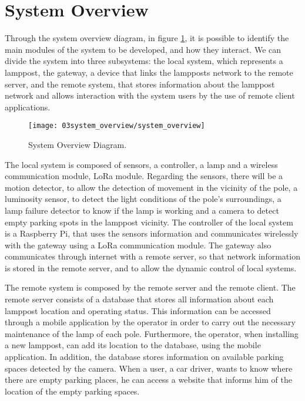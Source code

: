 \section{System Overview}
Through the system overview diagram, in figure \ref{fig:system_overview}, it is possible to identify the main modules of the system to be developed, and how they interact. We can divide the system into three subsystems: the local system, which represents a lamppost, the gateway, a device that links the lampposts network to the remote server, and the remote system, that stores information about the lamppost network and allows interaction with the system users by the use of remote client applications.

\begin{figure}[H]
	\centering
	\texttt{[image: 03system\_overview/system\_overview]}
	\caption{System Overview Diagram.}
	\label{fig:system_overview}
\end{figure}

The local system is composed of sensors, a controller, a lamp and a wireless communication module, LoRa module. Regarding the sensors, there will be a motion detector, to allow the detection of movement in the vicinity of the pole, a luminosity sensor, to detect the light conditions of the pole’s surroundings, a lamp failure detector to know if the lamp is working and a camera to detect empty parking spots in the lamppost vicinity. The controller of the local system is a Raspberry Pi, that uses the sensors information and communicates wirelessly with the gateway using a LoRa communication module. The gateway also communicates through internet with a remote server, so that network information is stored in the remote server, and to allow the dynamic control of local systems.

The remote system is composed by the remote server and the remote client. The remote server consists of a database that stores all information about each lamppost location and operating status. This information can be accessed through a mobile application by the operator in order to carry out the necessary maintenance of the lamp of each pole. Furthermore, the operator, when installing a new lamppost, can add its location to the database, using the mobile application. In addition, the database stores information on available parking spaces detected by the camera. When a user, a car driver, wants to know where there are empty parking places, he can access a website that informs him of the location of the empty parking spaces.

